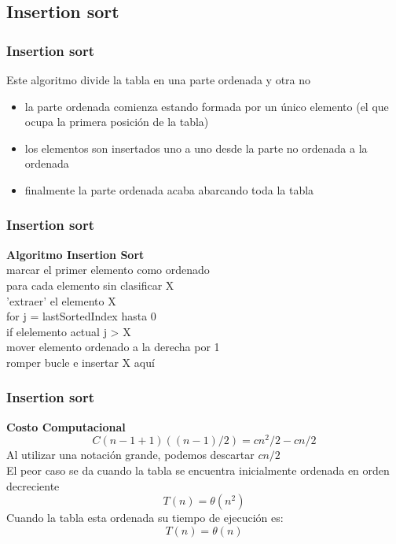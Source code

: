 \documentclass{beamer}
\begin{document}
\subsection{Insertion sort}
  \begin{frame}
 \frametitle{Insertion sort}
    \begin{block}{}
Este algoritmo divide la tabla en una parte ordenada y otra no
\begin{itemize}
    \item la parte ordenada comienza estando formada por un único elemento (el que ocupa la primera posición de la tabla)
    \item los elementos son insertados uno a uno desde la parte no ordenada a la ordenada
    \item finalmente la parte ordenada acaba abarcando toda la tabla
\end{itemize}
  \end{block}  
\end{frame}
 \begin{frame}
 \frametitle{Insertion sort}
    \begin{block}{}
\textbf{Algoritmo Insertion Sort}\\
\tab marcar el primer elemento como ordenado\\
\tab para cada elemento sin clasificar X\\
\tab \tab    'extraer' el elemento X\\
\tab \tab    for j = lastSortedIndex hasta 0\\
\tab \tab \tab      if elelemento actual j > X\\
\tab \tab \tab        mover elemento ordenado a la derecha por 1\\
\tab \tab      romper bucle e insertar X aquí\\
  \end{block}  
\end{frame}
  \begin{frame}
 \frametitle{Insertion sort}
    \begin{block}{}
\textbf{Costo Computacional}\\
\begin{equation}
C(n-1+1)((n-1)/2)=cn^2/2-cn/2
\end{equation}
Al utilizar una notación grande, podemos descartar $cn/2$\\
El peor caso se da cuando la tabla se encuentra inicialmente ordenada en orden decreciente
\begin{equation}
T(n)=\theta(n^2)
\end{equation}
Cuando la tabla esta ordenada su tiempo de ejecución es:
\begin{equation}
T(n)= \theta(n)
\end{equation}
  \end{block}  
\end{frame}
\end{document}
